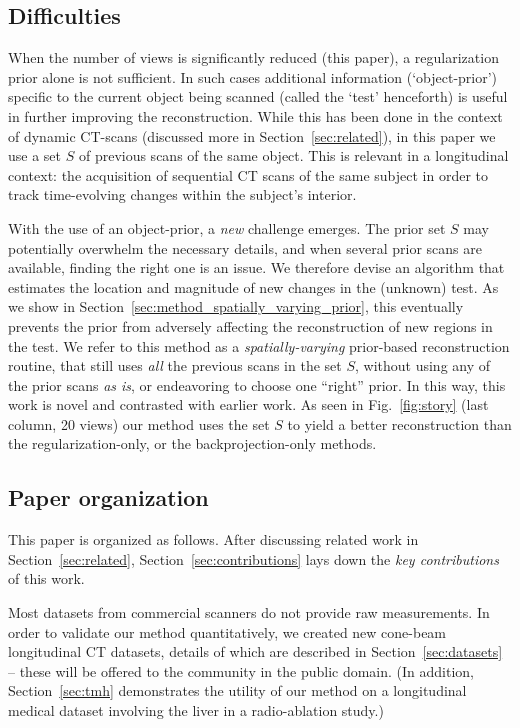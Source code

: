 \documentclass[journal]{IEEEtran}
\begin{document}
 \subsection{Difficulties}
 When the number of views is significantly reduced (this paper), a
 regularization prior alone is not sufficient.  In such cases
 additional information (`object-prior') specific to the current
 object being scanned (called the `test' henceforth) is useful in
 further improving the reconstruction.  While this has been done in
 the context of dynamic CT-scans (discussed more in
 Section~\ref{sec:related}), in this paper we use a set $S$ of
 previous scans of the same object. This is relevant in a longitudinal
 context: the acquisition of sequential CT scans of the same subject
 in order to track time-evolving changes within the subject's
 interior. 

 With the use of an object-prior, a \emph{new} challenge emerges. The prior
 set $S$ may potentially overwhelm the necessary details, and when
 several prior scans are available, finding the right one is an
 issue. We therefore devise an algorithm that estimates the location
 and magnitude of new changes in the (unknown) test. As we show in
 Section~\ref{sec:method_spatially_varying_prior}, this eventually
 prevents the prior from adversely affecting the reconstruction of new
 regions in the test. We refer to this method as a
 \textit{spatially-varying} prior-based reconstruction routine, that
 still uses \textit{all} the previous scans in the set $S$, without
 using any of the prior scans \textit{as is}, or endeavoring to choose
 one ``right'' prior. In this way, this work is novel and contrasted
 with earlier work. As seen in Fig.~\ref{fig:story} (last column, 20
 views) our method uses the set $S$ to yield a better reconstruction
 than the regularization-only, or the backprojection-only methods.

 \subsection{Paper organization}
 This paper is organized as follows. After discussing related work in
 Section~\ref{sec:related}, Section~\ref{sec:contributions} lays down
 the \emph{key contributions} of this work.
 
Most datasets from commercial scanners do not provide raw
measurements. In order to validate our method quantitatively, we
created new cone-beam longitudinal CT datasets, details of which are
described in Section~\ref{sec:datasets} -- these will be offered to
the community in the public domain.  (In addition,
Section~\ref{sec:tmh} demonstrates the utility of our method on a
longitudinal medical dataset involving the liver in a radio-ablation
study.)
 
\end{document}
